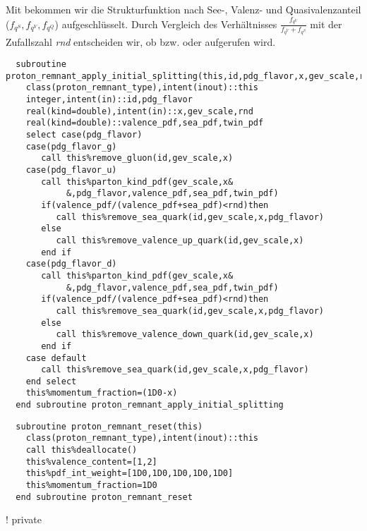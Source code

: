 Mit  bekommen wir die Strukturfunktion nach See-, Valenz- und Quasivalenzanteil ($f_{q^S},f_{q^V},f_{q^Q}$) aufgeschlüsselt. Durch Vergleich des Verhältnisses $\frac{f_{q^V}}{f_{q^V}+f_{q^S}}$ mit der Zufallszahl \emph{rnd} entscheiden wir, ob  bzw.  oder  aufgerufen wird.
\begin{Verbatim}
  subroutine proton_remnant_apply_initial_splitting(this,id,pdg_flavor,x,gev_scale,rnd)
    class(proton_remnant_type),intent(inout)::this
    integer,intent(in)::id,pdg_flavor
    real(kind=double),intent(in)::x,gev_scale,rnd
    real(kind=double)::valence_pdf,sea_pdf,twin_pdf
    select case(pdg_flavor)
    case(pdg_flavor_g)
       call this%remove_gluon(id,gev_scale,x)
    case(pdg_flavor_u)
       call this%parton_kind_pdf(gev_scale,x&
            &,pdg_flavor,valence_pdf,sea_pdf,twin_pdf)
       if(valence_pdf/(valence_pdf+sea_pdf)<rnd)then
          call this%remove_sea_quark(id,gev_scale,x,pdg_flavor)
       else
          call this%remove_valence_up_quark(id,gev_scale,x)
       end if
    case(pdg_flavor_d)
       call this%parton_kind_pdf(gev_scale,x&
            &,pdg_flavor,valence_pdf,sea_pdf,twin_pdf)
       if(valence_pdf/(valence_pdf+sea_pdf)<rnd)then
          call this%remove_sea_quark(id,gev_scale,x,pdg_flavor)
       else
          call this%remove_valence_down_quark(id,gev_scale,x)
       end if
    case default
       call this%remove_sea_quark(id,gev_scale,x,pdg_flavor)
    end select
    this%momentum_fraction=(1D0-x)
  end subroutine proton_remnant_apply_initial_splitting
\end{Verbatim}
\begin{Verbatim}
  subroutine proton_remnant_reset(this)
    class(proton_remnant_type),intent(inout)::this
    call this%deallocate()
    this%valence_content=[1,2]
    this%pdf_int_weight=[1D0,1D0,1D0,1D0,1D0]
    this%momentum_fraction=1D0
  end subroutine proton_remnant_reset
\end{Verbatim}
  ! private

